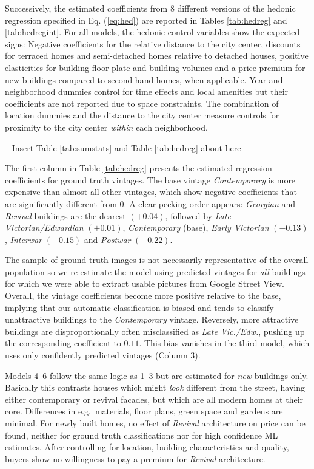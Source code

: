 \documentclass[]{article}
\begin{document}
Successively, the estimated coefficients from 8 different versions of
the hedonic regression specified in Eq. (\ref{eq:hed}) are reported in
Tables \ref{tab:hedreg} and \ref{tab:hedregint}. For all models, the
hedonic control variables show the expected signs: Negative coefficients
for the relative distance to the city center, discounts for terraced
homes and semi-detached homes relative to detached houses, positive
elasticities for building floor plate and building volumes and a price
premium for new buildings compared to second-hand homes, when
applicable. Year and neighborhood dummies control for time effects and
local amenities but their coefficients are not reported due to space
constraints. The combination of location dummies and the distance to the
city center measure controls for proximity to the city center
\emph{within} each neighborhood.

\begin{center}
  -- Insert Table \ref{tab:sumstats} and Table \ref{tab:hedreg} about here --
\end{center}

The first column in Table \ref{tab:hedreg} presents the estimated
regression coefficients for ground truth vintages. The base vintage
\emph{Contemporary} is more expensive than almost all other vintages,
which show negative coefficients that are significantly different from
0. A clear pecking order appears: \emph{Georgian} and \emph{Revival}
buildings are the dearest \((+0.04)\), followed by \emph{Late
Victorian/Edwardian} \((+0.01)\), \emph{Contemporary} (base),
\emph{Early Victorian} \((-0.13)\), \emph{Interwar} \((-0.15)\) and
\emph{Postwar} \((-0.22)\).

The sample of ground truth images is not necessarily representative of
the overall population so we re-estimate the model using predicted
vintages for \emph{all} buildings for which we were able to extract
usable pictures from Google Street View. Overall, the vintage
coefficients become more positive relative to the base, implying that
our automatic classification is biased and tends to classify
unattractive buildings to the \emph{Contemporary} vintage. Reversely,
more attractive buildings are disproportionally often misclassified as
\emph{Late Vic./Edw.}, pushing up the corresponding coefficient to
\(0.11\). This bias vanishes in the third model, which uses only
confidently predicted vintages (Column 3).

Models 4--6 follow the same logic as 1--3 but are estimated for
\emph{new} buildings only. Basically this contrasts houses which might
\emph{look} different from the street, having either contemporary or
revival facades, but which are all modern homes at their core.
Differences in e.g.~materials, floor plans, green space and gardens are
minimal. For newly built homes, no effect of \emph{Revival} architecture
on price can be found, neither for ground truth classifications nor for
high confidence ML estimates. After controlling for location, building
characteristics and quality, buyers show no willingness to pay a premium
for \emph{Revival} architecture.
\end{document}
